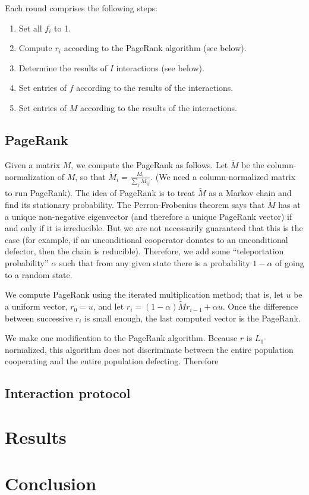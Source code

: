 \documentclass{amsart}
\begin{document}
Each round comprises the following steps:

\begin{enumerate}
\item Set all $f_i$ to 1.
\item Compute $r_i$ according to the PageRank algorithm (see below).
\item Determine the results of $I$ interactions (see below).
\item Set entries of $f$ according to the results of the interactions.
\item Set entries of $M$ according to the results of the interactions.
\end{enumerate}

\subsection{PageRank}
\newcommand{\tM}{\tilde M}

Given a matrix $M$, we compute the PageRank as follows. Let $\tM$ be the column-normalization of $M$, so that $\tM_i = \frac{M_i}{\sum_j M_{ij}}$. (We need a column-normalized matrix to run PageRank). The idea of PageRank is to treat $\tM$ as a Markov chain and find its stationary probability. The Perron-Frobenius theorem says that $\tM$ has at a unique non-negative eigenvector (and therefore a unique PageRank vector) if and only if it is irreducible. But we are not necessarily guaranteed that this is the case (for example, if an unconditional cooperator donates to an unconditional defector, then the chain is reducible). Therefore, we add some ``teleportation probability'' $\alpha$ such that from any given state there is a probability $1-\alpha$ of going to a random state.

We compute PageRank using the iterated multiplication method; that is, let $u$ be a uniform vector, $r_0 = u$, and let $r_i = (1-\alpha)\tilde M r_{i-1} + \alpha u$. Once the difference between successive $r_i$ is small enough, the last computed vector is the PageRank.

We make one modification to the PageRank algorithm. Because $r$ is $L_1$-normalized, this algorithm does not discriminate between the entire population cooperating and the entire population defecting. Therefore

\subsection{Interaction protocol}

\section{Results}

\section{Conclusion}



\end{document}
